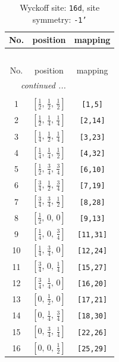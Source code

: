 \documentclass[fleqn,8pt]{jsarticle}
\begin{document}
\renewcommand{\arraystretch}{1.2}
\begin{longtable}{ccc}
\caption{Wyckoff site: {\tt 16d}, site symmetry: {\tt -1'}}
 \\
 \hline \hline
No. & position & mapping \\ \hline \endfirsthead

\multicolumn{2}{l}{\tablename\ \thetable{}} \\
 \hline \hline
No. & position & mapping \\ \hline \endhead

 \hline \hline
\multicolumn{2}{r}{\footnotesize\it continued ...} \\ \endfoot

 \hline \hline
\multicolumn{2}{r}{} \\ \endlastfoot

1 & $\left[ \frac{1}{2},\, \frac{1}{2},\, \frac{1}{2} \right]$ & {\tt [1,5]} \\ \hline
2 & $\left[ \frac{1}{2},\, \frac{1}{4},\, \frac{1}{4} \right]$ & {\tt [2,14]} \\ \hline
3 & $\left[ \frac{1}{4},\, \frac{1}{2},\, \frac{1}{4} \right]$ & {\tt [3,23]} \\ \hline
4 & $\left[ \frac{1}{4},\, \frac{1}{4},\, \frac{1}{2} \right]$ & {\tt [4,32]} \\ \hline
5 & $\left[ \frac{1}{2},\, \frac{3}{4},\, \frac{3}{4} \right]$ & {\tt [6,10]} \\ \hline
6 & $\left[ \frac{3}{4},\, \frac{1}{2},\, \frac{3}{4} \right]$ & {\tt [7,19]} \\ \hline
7 & $\left[ \frac{3}{4},\, \frac{3}{4},\, \frac{1}{2} \right]$ & {\tt [8,28]} \\ \hline
8 & $\left[ \frac{1}{2},\, 0,\, 0 \right]$ & {\tt [9,13]} \\ \hline
9 & $\left[ \frac{1}{4},\, 0,\, \frac{3}{4} \right]$ & {\tt [11,31]} \\ \hline
10 & $\left[ \frac{1}{4},\, \frac{3}{4},\, 0 \right]$ & {\tt [12,24]} \\ \hline
11 & $\left[ \frac{3}{4},\, 0,\, \frac{1}{4} \right]$ & {\tt [15,27]} \\ \hline
12 & $\left[ \frac{3}{4},\, \frac{1}{4},\, 0 \right]$ & {\tt [16,20]} \\ \hline
13 & $\left[ 0,\, \frac{1}{2},\, 0 \right]$ & {\tt [17,21]} \\ \hline
14 & $\left[ 0,\, \frac{1}{4},\, \frac{3}{4} \right]$ & {\tt [18,30]} \\ \hline
15 & $\left[ 0,\, \frac{3}{4},\, \frac{1}{4} \right]$ & {\tt [22,26]} \\ \hline
16 & $\left[ 0,\, 0,\, \frac{1}{2} \right]$ & {\tt [25,29]} \\
\end{longtable}
\end{document}
